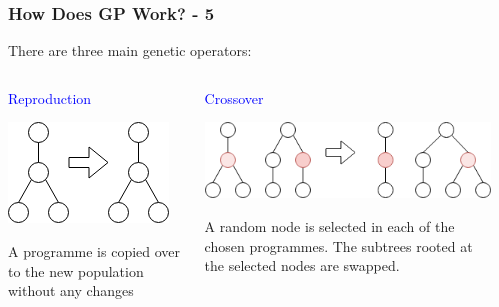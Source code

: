 \documentclass{beamer}
\newcommand{\blue}[1]{\textcolor{blue}{#1}}
\begin{document}
		\begin{frame}
			
			\frametitle{How Does GP Work? - 5}
			
			There are three main genetic operators:
			
			\medskip
			\pause
			
			\begin{columns}[T]
				
				\begin{column}{0.2\textwidth}
					
					\blue{Reproduction}
					
					\medskip
					
					\includegraphics[scale=0.35]{resources/5_reproduction}
					
					\begin{small}
						A programme is copied over to the new population without any changes
					\end{small}
				
				\end{column}
			
				\pause
			
				\begin{column}{0.4\textwidth}
					
					\blue{Crossover}
					
					\medskip
					
					\includegraphics[scale=0.35]{resources/6_crossover}
					\begin{small}
						A random node is selected in each of the chosen programmes. The subtrees rooted at the selected nodes are swapped.
					\end{small}
			
				\end{column}
			
				\pause
			
				\begin{column}{0.3\textwidth}
					

\end{column}
\end{columns}
\end{frame}
\end{document}
